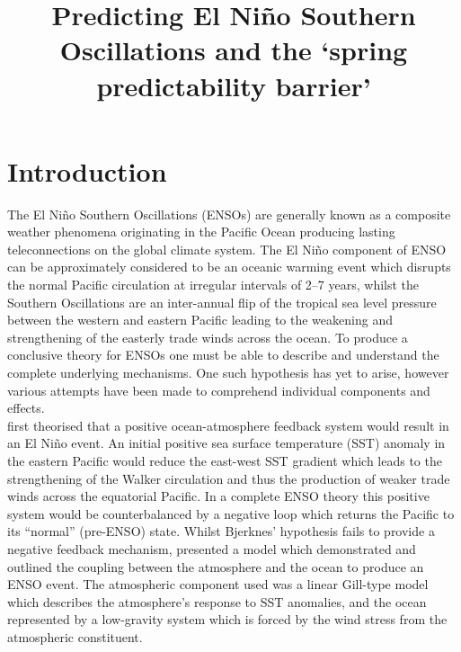 \documentclass[12pt, onecolumn]{revtex4}    %
\begin{document}
                     

\title{Predicting El Ni\~{n}o Southern Oscillations and the `spring predictability barrier'} 

\maketitle
\thispagestyle{plain} %

\section{Introduction}
The El Ni\~{n}o Southern Oscillations (ENSOs) are generally known as a composite weather phenomena originating in the Pacific Ocean producing lasting teleconnections on the global climate system. The El Ni\~{n}o component of ENSO can be approximately considered to be an oceanic warming event which disrupts the normal Pacific circulation at irregular intervals of 2--7 years, whilst the Southern Oscillations are an inter-annual flip of the tropical sea level pressure between the western and eastern Pacific leading to the weakening and strengthening of the easterly trade winds across the ocean. To produce a conclusive theory for ENSOs one must be able to describe and understand the complete underlying mechanisms. One such hypothesis has yet to arise, however various attempts have been made to comprehend individual components and effects. \\

\cite{doi:10.1175/1520-04931969097} first theorised that a positive ocean-atmosphere feedback system would result in an El Ni\~{n}o event. An initial positive sea surface temperature (SST) anomaly in the eastern Pacific would reduce the east-west SST gradient which leads to the strengthening of the Walker circulation and thus the production of weaker trade winds across the equatorial Pacific. In a complete ENSO theory this positive system would be counterbalanced by a negative loop which returns the Pacific to its ``normal'' (pre-ENSO) state. Whilst Bjerknes' hypothesis fails to provide a negative feedback mechanism, \cite{Zebiak:1987aa} presented a model which demonstrated and outlined the coupling between the atmosphere and the ocean to produce an ENSO event. The atmospheric component used was a linear Gill-type model \citep{Gill:1980aa} which describes the atmosphere's response to SST anomalies, and the ocean represented by a low-gravity system which is forced by the wind stress from the atmospheric constituent. \\
\end{document}
